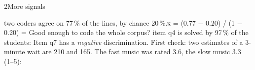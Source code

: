 \begin{wsbox}{2}{More signals \enspace{\normalfont\small\textcolor{muted}{one per data type}}}
\begin{lueckentext}
 two coders agree on 77\,\% of the lines, by chance 20\,\%.\enspace κ = (0.77 − 0.20) / (1 − 0.20) = \newline
Good enough to code the whole corpus? 
 item q4 is solved by 97\,\% of the students: 
Item q7 has a \emph{negative} discrimination. First check: 
 two estimates of a 3-minute wait are 210 and 165. 
The fast music was rated 3.6, the slow music 3.3 (1–5): 
\end{lueckentext}
\end{wsbox}

